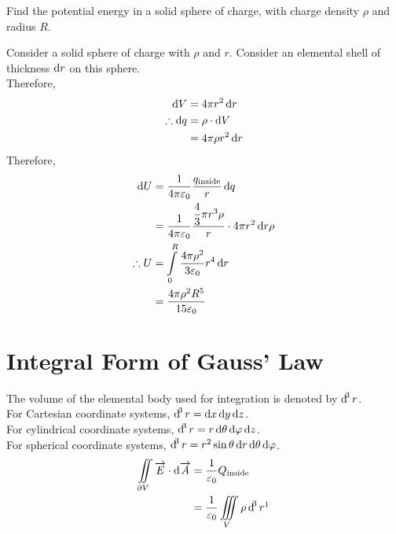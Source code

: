 \documentclass[fleqn, a4paper, 12pt, twoside]{article}
\theoremstyle{definition}
\theoremstyle{theorem}
\begin{document}
\begin{question}
	Find the potential energy in a solid sphere of charge, with charge density $\rho$ and radius $R$.
\end{question}

\begin{solution}
	Consider a solid sphere of charge with $\rho$ and $r$.
	Consider an elemental shell of thickness $\dif r$ on this sphere.\\
	Therefore,
	\begin{align*}
		\dif V &= 4 \pi r^2 \dif r\\
		\therefore \dif q &= \rho \cdot \dif V\\
		&= 4 \pi \rho r^2 \dif r
	\end{align*}
	Therefore,
	\begin{align*}
		\dif U &= \dfrac{1}{4 \pi \varepsilon_0} \dfrac{q_{\textnormal{inside}}}{r} \dif q\\
		&= \dfrac{1}{4 \pi \varepsilon_0} \dfrac{\dfrac{4}{3} \pi r^3 \rho}{r} \cdot 4 \pi r^2 \dif r \rho\\
		\therefore U &= \int\limits_{0}^{R} \dfrac{4 \pi \rho^2}{3 \varepsilon_0} r^4 \dif r\\
		&= \dfrac{4 \pi \rho^2 R^5}{15 \varepsilon_0}
	\end{align*}
\end{solution}

\section{Integral Form of Gauss' Law}

The volume of the elemental body used for integration is denoted by $\dif^3 r$.\\
For Cartesian coordinate systems, $\dif^3 r = \dif x \dif y \dif z$.\\
For cylindrical coordinate systems, $\dif^3 r = r \dif \theta \dif \varphi \dif z$.\\
For spherical coordinate systems, $\dif^3 r = r^2 \sin \theta \dif r \dif \theta \dif \varphi $.\\

\begin{align*}
	\iint\limits_{\partial V} \overrightarrow{E} \cdot \dif \overrightarrow{A} &= \dfrac{1}{\varepsilon_0} Q_{\textnormal{inside}}\\
	&= \dfrac{1}{\varepsilon_0} \iiint\limits_{V} \rho \dif^3 r 
	\footnotemark
\end{align*}
\end{document}
